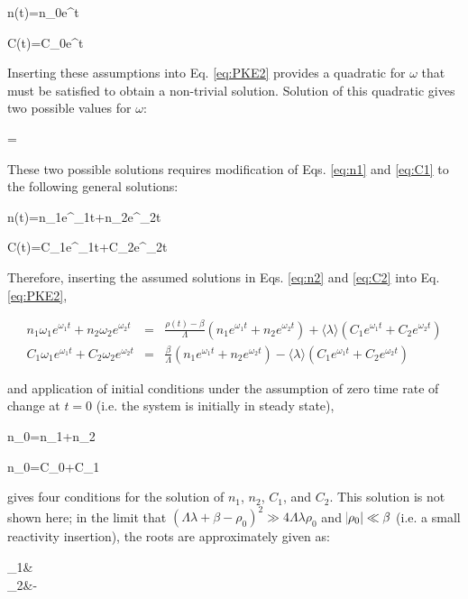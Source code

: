 \beq
\label{eq:n1}
n(t)=n_0e^{\omega t}
\eeq

\beq
\label{eq:C1}
C(t)=C_0e^{\omega t}
\eeq

Inserting these assumptions into Eq. \eqref{eq:PKE2} provides a quadratic for \(\omega\) that must be satisfied to obtain a non-trivial solution. Solution of this quadratic gives two possible values for \(\omega\):

\beq
\omega=
\eeq

These two possible solutions requires modification of Eqs. \eqref{eq:n1} and \eqref{eq:C1} to the following general solutions:

\beq
\label{eq:n2}
n(t)=n_1e^{\omega_1t}+n_2e^{\omega_2t}
\eeq

\beq
\label{eq:C2}
C(t)=C_1e^{\omega_1t}+C_2e^{\omega_2t}
\eeq

Therefore, inserting the assumed solutions in Eqs. \eqref{eq:n2} and \eqref{eq:C2} into Eq. \eqref{eq:PKE2},

\begin{subequations}
\label{eq:PKE3}
\begin{eqnarray}
n_1\omega_1e^{\omega_1t}+n_2\omega_2e^{\omega_2t}&=&\frac{\rho(t)-\beta}{\Lambda}\left(n_1e^{\omega_1t}+n_2e^{\omega_2t}\right)+\langle\lambda\rangle \left(C_1e^{\omega_1t}+C_2e^{\omega_2t}\right)\\
C_1\omega_1e^{\omega_1t}+C_2\omega_2e^{\omega_2t}&=&\frac{\beta}{\Lambda}\left(n_1e^{\omega_1t}+n_2e^{\omega_2t}\right)-\langle\lambda\rangle \left(C_1e^{\omega_1t}+C_2e^{\omega_2t}\right)
\end{eqnarray}
\end{subequations}

and application of initial conditions under the assumption of zero time rate of change at \(t=0\) (i.e. the system is initially in steady state), 

\beq
n_0=n_1+n_2
\eeq

\beq
\frac{\beta}{\Lambda\langle\lambda\rangle}n_0=C_0+C_1
\eeq

gives four conditions for the solution of \(n_1\), \(n_2\), \(C_1\), and \(C_2\). This solution is not shown here; in the limit that \((\Lambda\lambda+\beta-\rho_0)^2 \gg 4\Lambda\lambda\rho_0\) and \(\abs{\rho_0}\ll\beta\) (i.e. a small reactivity insertion), the roots are approximately given as:

\beqa
\label{eq:omegaPKE2}
\omega_1\approx&\\
\omega_2\approx&-\\
\eeqa 

